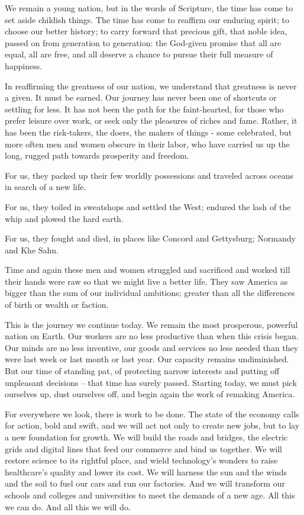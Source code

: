 {We remain a young nation, but in the words of Scripture, the time has come to set aside childish things. The time has come to reaffirm our enduring spirit; to choose our better history; to carry forward that precious gift, that noble idea, passed on from generation to generation: the God-given promise that all are equal, all are free, and all deserve a chance to pursue their full measure of happiness.

In reaffirming the greatness of our nation, we understand that greatness is never a given. It must be earned. Our journey has never been one of shortcuts or settling for less. It has not been the path for the faint-hearted, for those who prefer leisure over work, or seek only the pleasures of riches and fame. Rather, it has been the risk-takers, the doers, the makers of things - some celebrated, but more often men and women obscure in their labor, who have carried us up the long, rugged path towards prosperity and freedom.

For us, they packed up their few worldly possessions and traveled across oceans in search of a new life.

For us, they toiled in sweatshops and settled the West; endured the lash of the whip and plowed the hard earth.

For us, they fought and died, in places like Concord and Gettysburg; Normandy and Khe Sahn.

Time and again these men and women struggled and sacrificed and worked till their hands were raw so that we might live a better life. They saw America as bigger than the sum of our individual ambitions; greater than all the differences of birth or wealth or faction.

This is the journey we continue today. We remain the most prosperous, powerful nation on Earth. Our workers are no less productive than when this crisis began. Our minds are no less inventive, our goods and services no less needed than they were last week or last month or last year. Our capacity remains undiminished. But our time of standing pat, of protecting narrow interests and putting off unpleasant decisions -- that time has surely passed. Starting today, we must pick ourselves up, dust ourselves off, and begin again the work of remaking America.

For everywhere we look, there is work to be done. The state of the economy calls for action, bold and swift, and we will act not only to create new jobs, but to lay a new foundation for growth. We will build the roads and bridges, the electric grids and digital lines that feed our commerce and bind us together. We will restore science to its rightful place, and wield technology's wonders to raise healthcare's quality and lower its cost. We will harness the sun and the winds and the soil to fuel our cars and run our factories. And we will transform our schools and colleges and universities to meet the demands of a new age. All this we can do. And all this we will do.

}
